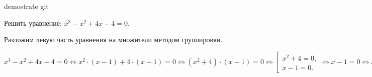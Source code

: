 demostrate git


 Решить уравнение: $x^3-x^2+4x-4=0$.


\Solution Разложим левую часть уравнения на множители методом группировки.
\begin{center}
$x^3-x^2+4x-4=0 \Leftrightarrow x^2\cdot (x-1)+4\cdot (x-1)=0 \Leftrightarrow (x^2+4)\cdot (x-1)=0 \Leftrightarrow \left[
\begin{array}{l}
x^2+4=0,\\
x-1=0.
\end{array}
\right.\Leftrightarrow x-1=0 \Leftrightarrow x=1.$
\end{center}

